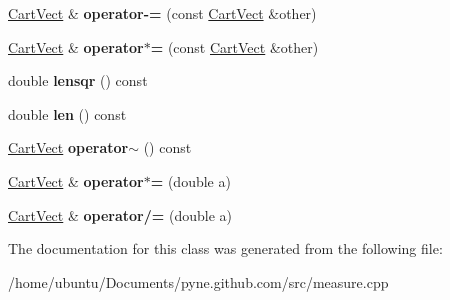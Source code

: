 \begin{DoxyCompactItemize}
\item 
\hyperlink{class_cart_vect}{Cart\+Vect} \& {\bfseries operator-\/=} (const \hyperlink{class_cart_vect}{Cart\+Vect} \&other)\hypertarget{class_cart_vect_a459252305cedf4e95a997bd46a26e9b8}{}\label{class_cart_vect_a459252305cedf4e95a997bd46a26e9b8}

\item 
\hyperlink{class_cart_vect}{Cart\+Vect} \& {\bfseries operator$\ast$=} (const \hyperlink{class_cart_vect}{Cart\+Vect} \&other)\hypertarget{class_cart_vect_ae4d813aaf367f7260870b051062a776f}{}\label{class_cart_vect_ae4d813aaf367f7260870b051062a776f}

\item 
double {\bfseries lensqr} () const \hypertarget{class_cart_vect_a9ab6e8cdf915cde3cf166a6c8c10ce17}{}\label{class_cart_vect_a9ab6e8cdf915cde3cf166a6c8c10ce17}

\item 
double {\bfseries len} () const \hypertarget{class_cart_vect_a4809574b9b0bc24075da36e5b60e6988}{}\label{class_cart_vect_a4809574b9b0bc24075da36e5b60e6988}

\item 
\hyperlink{class_cart_vect}{Cart\+Vect} {\bfseries operator$\sim$} () const \hypertarget{class_cart_vect_aeafa9899c84e5ed65f3217fc1217e7a2}{}\label{class_cart_vect_aeafa9899c84e5ed65f3217fc1217e7a2}

\item 
\hyperlink{class_cart_vect}{Cart\+Vect} \& {\bfseries operator$\ast$=} (double a)\hypertarget{class_cart_vect_a3dec977a311cf363e0ce7f2983370b10}{}\label{class_cart_vect_a3dec977a311cf363e0ce7f2983370b10}

\item 
\hyperlink{class_cart_vect}{Cart\+Vect} \& {\bfseries operator/=} (double a)\hypertarget{class_cart_vect_aaf0806de8642163882bc844e55fa921f}{}\label{class_cart_vect_aaf0806de8642163882bc844e55fa921f}

\end{DoxyCompactItemize}


The documentation for this class was generated from the following file\+:\begin{DoxyCompactItemize}
\item 
/home/ubuntu/\+Documents/pyne.\+github.\+com/src/measure.\+cpp\end{DoxyCompactItemize}
